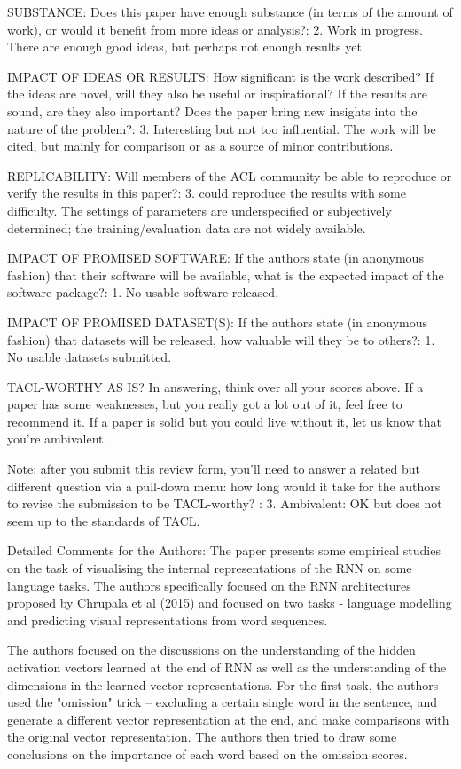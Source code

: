 \documentclass[10pt,a4paper]{letter}
\begin{document}
SUBSTANCE: Does this paper have enough substance (in terms of the amount of
work), or would it benefit from more ideas or analysis?:
        2. Work in progress. There are enough good ideas, but perhaps not enough
results yet.

IMPACT OF IDEAS OR RESULTS: How significant is the work described? If the
ideas are novel, will they also be useful or inspirational? If the results
are sound, are they also important? Does the paper bring new insights into
the nature of the problem?:
        3. Interesting but not too influential. The work will be cited, but mainly
for comparison or as a source of minor contributions.

REPLICABILITY: Will members of the ACL community be able to reproduce or
verify the results in this paper?:
        3. could reproduce the results with some difficulty. The settings of
parameters are underspecified or subjectively determined; the
training/evaluation data are not widely available.

IMPACT OF PROMISED SOFTWARE:  If the authors state (in anonymous fashion)
that their software will be available, what is the expected impact of the
software package?:
        1. No usable software released.

IMPACT OF PROMISED DATASET(S): If the authors state (in anonymous fashion)
that datasets will be released, how valuable will they be to others?:
        1. No usable datasets submitted.


TACL-WORTHY AS IS? In answering, think over all your scores above. If a
paper has some weaknesses, but you really got a lot out of it, feel free to
recommend it. If a paper is solid but you could live without it, let us know
that you're ambivalent.

Note: after you submit this review form, you'll need to answer a related but
different question via a pull-down menu: how long would it take for the
authors to revise the submission to be TACL-worthy?
:
        3. Ambivalent: OK but does not seem up to the standards of TACL.

Detailed Comments for the Authors:
        The paper presents some empirical studies on the task of visualising the
internal representations of the RNN on some language tasks. The authors
specifically focused on the RNN architectures proposed by Chrupala et al
(2015) and focused on two tasks - language modelling and predicting visual
representations from word sequences.

The authors focused on the discussions on the understanding of the hidden
activation vectors learned at the end of RNN as well as the understanding of
the dimensions in the learned vector representations. For the first task,
the authors used the "omission" trick -- excluding a certain single word in
the sentence, and generate a different vector representation at the end, and
make comparisons with the original vector representation. The authors then
tried to draw some conclusions on the importance of each word based on the
omission scores.
\end{document}
